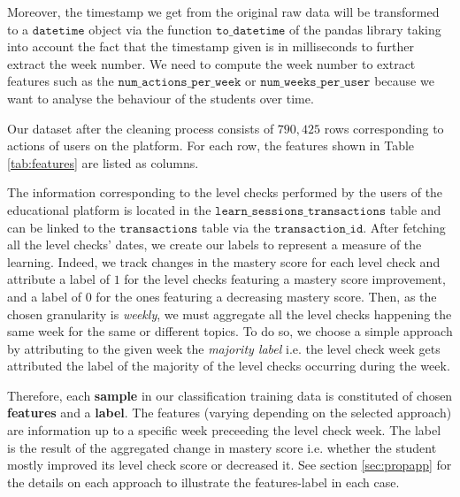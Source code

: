 \documentclass[sigplan,screen]{acmart}
\begin{document}
Moreover, the timestamp we get from the original raw data will be transformed to a $\texttt{datetime}$ object via the function $\texttt{to\_datetime}$ of the pandas library taking into account the fact that the timestamp given is in milliseconds to further extract the week number. We need to compute the week number to extract features such as the $\texttt{num\_actions\_per\_week}$ or $\texttt{num\_weeks\_per\_user}$ because we want to analyse the behaviour of the students over time.


Our dataset after the cleaning process consists of $790,425$ rows corresponding to actions of users on the platform. For each row, the features shown in Table \ref{tab:features} are listed as columns.

The information corresponding to the level checks performed by the users of the educational platform is located in the $\texttt{learn\_sessions\_transactions}$ table and can be linked to the $\texttt{transactions}$ table via the $\texttt{transaction\_id}$. After fetching all the level checks' dates, we create our labels to represent a measure of the learning. Indeed, we track changes in the mastery score for each level check and attribute a label of $1$ for the level checks featuring a mastery score improvement, and a label of $0$ for the ones featuring a decreasing mastery score. Then, as the chosen granularity is \textit{weekly}, we must aggregate all the level checks happening the same week for the same or different topics. To do so, we choose a simple approach by attributing to the given week the \textit{majority label} i.e. the level check week gets attributed the label of the majority of the level checks occurring during the week.

Therefore, each \textbf{sample} in our classification training data is constituted of chosen \textbf{features} and a \textbf{label}. The features (varying depending on the selected approach) are information up to a specific week preceeding the level check week. The label is the result of the aggregated change in mastery score i.e. whether the student mostly improved its level check score or decreased it. See section \ref{sec:propapp} for the details on each approach to illustrate the features-label in each case.
\end{document}
